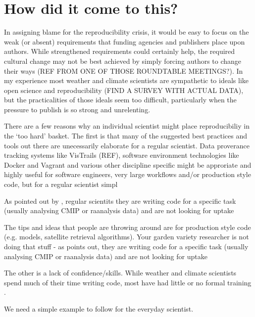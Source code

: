 \section{How did it come to this?}

In assigning blame for the reproducibility crisis, it would be easy to focus on the weak (or absent) requirements that funding agencies and publishers place upon authors. While strengthened requirements could certainly help, the required cultural change may not be best achieved by simply forcing authors to change their ways (REF FROM ONE OF THOSE ROUNDTABLE MEETINGS?). In my experience most weather and climate scientists are sympathetic to ideals like open science and reproducibility (FIND A SURVEY WITH ACTUAL DATA), but the practicalities of those ideals seem too difficult, particularly when the pressure to publish is so strong and unrelenting. 

There are a few reasons why an individual scientist might place reproducibiliy in the `too hard' basket. The first is that many of the suggested best practices and tools out there are unecessarily elaborate for a regular scientist. Data proverance tracking systems like VisTrails (REF), software environment technologies like Docker and Vagrant \citep{Stodden2014} and various other discipline specific might be approriate and highly useful for software engineers, very large workflows and/or production style code, but for a regular scientist simpl  

As pointed out by \citet{Easterbrook2014}, regular scientits they are writing code for a specific task (usually analysing CMIP or raanalysis data) and are not looking for uptake 

The tips and ideas that people are throwing around are for production style code (e.g. models, satellite retrieval algorithms). Your garden variety researcher is not doing that stuff - as \citet{Easterbrook2014} points out, they are writing code for a specific task (usually analysing CMIP or raanalysis data) and are not looking for uptake 



The other is a lack of confidence/skills. While weather and climate scientists spend much of their time writing code, most have had little or no formal training \citet{Hannay2009}.   


We need a simple example to follow for the everyday scientist.